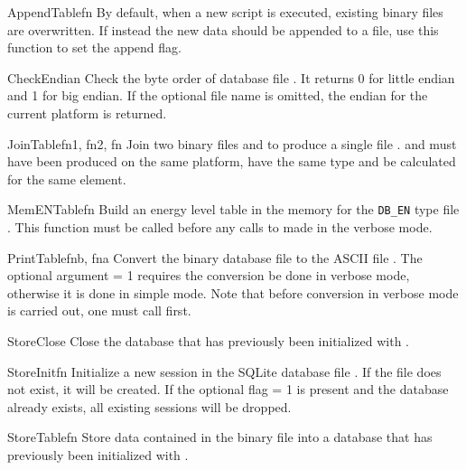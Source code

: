 \begin{fundesc}{AppendTable}{fn}
By default, when a new script is executed, existing binary files are
overwritten. If instead the new data should be appended to a file, use 
this function to set the append flag.
\end{fundesc}

\begin{fundesc}{CheckEndian}{}
Check the byte order of database file . It returns 0 for little endian
and 1 for big endian. If the optional file name  is omitted, the
endian for the current platform is returned.
\end{fundesc}

\begin{fundesc}{JoinTable}{fn1, fn2, fn}
Join two binary files  and  to produce a single file
.  and  must have been produced on the same
platform, have the same type and be calculated for the same element.
\end{fundesc}

\begin{fundesc}{MemENTable}{fn}
Build an energy level table in the memory for the \texttt{DB\_EN} type file
. This function must be called before any calls to 
made in the verbose mode.
\end{fundesc}

\begin{fundesc}{PrintTable}{fnb, fna}
Convert the binary database file  to the ASCII file . The
optional argument  = 1 requires the conversion be done in verbose
mode, otherwise it is done in simple mode. Note that before conversion in
verbose mode is carried out, one must call  first.
\end{fundesc}

\begin{fundesc}{StoreClose}{}
Close the database that has previously been initialized with
.
\end{fundesc}

\begin{fundesc}{StoreInit}{fn }
Initialize a new session in the SQLite database file . If the file does
not exist, it will be created. If the optional flag  = 1 is present
and the database already exists, all existing sessions will be dropped.
\end{fundesc}

\begin{fundesc}{StoreTable}{fn}
Store data contained in the binary file  into a database that has
previously been initialized with .
\end{fundesc}


